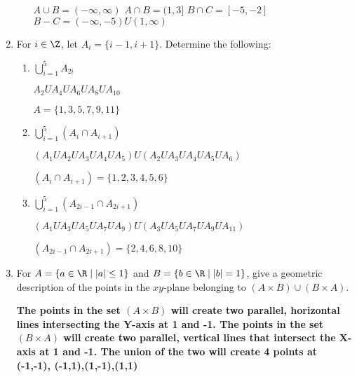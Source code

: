 \documentclass[12pt]{article}
\begin{document}
\begin{enumerate}
\begin{enumerate}
$A \cup B = (- \infty , \infty )$ \newline
$A \cap B = (1,3]  $ \newline
$B \cap C = [-5, -2]$ \newline
$B - C = (- \infty ,-5)U (1, \infty )$

\end{enumerate}

\item For $i \in \Z$, let $A_i = \{ i -1, i+1 \}$.  Determine the following:
\begin{enumerate}
\item $ \displaystyle \bigcup_{i=1}^{5} A_{2i}$


$A_2 U A_4 U A_6 U A_8 U A_10 $ 

$A = \{ 1,3,5,7,9,11\}$
\item $\displaystyle \bigcup_{i=1}^{5} (A_i \cap A_{i+1})$

$(A_1 U A_2 U A_3 U A_4 U A_5) U (A_2 U A_3 U A_4 U A_5 U A_6)$


$(A_i \cap A_{i+1}) = \{ 1,2,3,4,5,6\}$

\item $\displaystyle \bigcup_{i=1}^{5} (A_{2i-1} \cap A_{2i+1})$

$(A_1 U A_3 U A_5 U A_7 U A_9) U (A_3 U A_5 U A_7 U A_9 U A_11)$

$(A_{2i-1} \cap A_{2i+1}) = \{2,4,6,8,10 \}$

\end{enumerate}

\item For $A = \{ a \in \R \mid |a| \leq 1 \}$ and $B = \{ b \in \R \mid |b| = 1 \}$, give a geometric description of the points in the $xy$-plane belonging to $(A \times B) \cup (B \times A)$.

\textbf{The points in the set $(A \times B) $ will create two parallel, horizontal lines intersecting the Y-axis at 1 and -1. The points in the set $(B \times A ) $ will create two parallel, vertical lines that intersect the X-axis at 1 and -1.  The union of the two will create 4 points at (-1,-1), (-1,1),(1,-1),(1,1)}

\end{enumerate}
\end{document}
